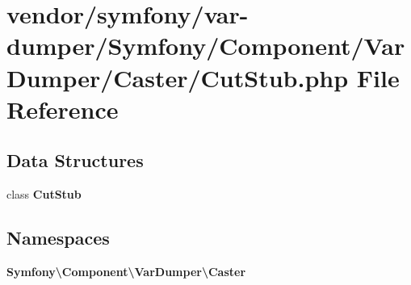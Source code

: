 \section{vendor/symfony/var-\/dumper/\+Symfony/\+Component/\+Var\+Dumper/\+Caster/\+Cut\+Stub.php File Reference}
\label{_cut_stub_8php}
\subsection*{Data Structures}
\begin{DoxyCompactItemize}
\item 
class {\bf Cut\+Stub}
\end{DoxyCompactItemize}
\subsection*{Namespaces}
\begin{DoxyCompactItemize}
\item 
 {\bf Symfony\textbackslash{}\+Component\textbackslash{}\+Var\+Dumper\textbackslash{}\+Caster}
\end{DoxyCompactItemize}
